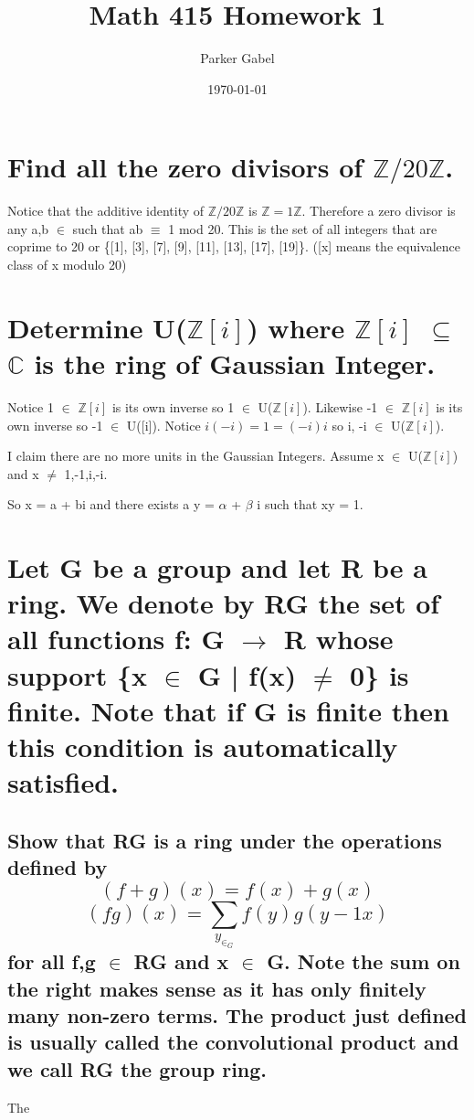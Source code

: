 \documentclass[11pt]{article}
\author{Parker Gabel}
\date{\today}
\title{Math 415 Homework 1}
\begin{document}
\maketitle

\section{Find all the zero divisors of \(\mathbb{Z}/20\mathbb{Z}\).}
\label{sec:orgafd2bb1}
Notice that the additive identity of \(\mathbb{Z}/20\mathbb{Z}\) is \(\mathbb{Z} = 1 \mathbb{Z}\). 
Therefore a zero divisor is any a,b \(\in\)  such that ab \(\equiv\) 1 mod 20. This is the set of all integers that are coprime to 20 or \{[1], [3], [7], [9], [11], [13], [17], [19]\}. ([x] means the equivalence class of x modulo 20)

\section{Determine U(\(\mathbb{Z}[i]\)) where \(\mathbb{Z}[i]\) \(\subseteq\) \(\mathbb{C}\) is the ring of Gaussian Integer.}
\label{sec:org5e4fd1e}
\quad Notice 1 \(\in\) \(\mathbb{Z}[i]\) is its own inverse so 1 \(\in\) U(\(\mathbb{Z}[i]\)). Likewise -1 \(\in\) \(\mathbb{Z}[i]\) is its own inverse so -1 \(\in\) U([i]).
Notice \(i(-i) = 1 = (-i)i\) so i, -i \(\in\) U(\(\mathbb{Z}[i]\)). \par 
I claim there are no more units in the Gaussian Integers.
Assume x \(\in\) U(\(\mathbb{Z}[i]\)) and x \(\ne\) 1,-1,i,-i. \par
So x = a + bi and there exists a y = \(\alpha\) + \(\beta\) i such that xy = 1. \par

\section{Let G be a group and let R be a ring.  We denote by RG the set of all functions f: G \(\to\) R whose support \{x \(\in\) G | f(x) \(\ne\) 0\} is finite.  Note that if G is finite then this condition is automatically satisfied.}
\label{sec:org036eeed}
\subsection{Show that RG is a ring under the operations defined by \[(f+g)(x) =f(x) +g(x)\]    \[(fg)(x) =\sum_y_\in_G f(y)g(y-1x) \]for all f,g \(\in\) RG and x \(\in\) G.  Note the sum on the right makes sense as it has only finitely many non-zero terms. The product just defined is usually called the convolutional product and we call RG the group ring.}
\label{sec:org0ea0a96}
The
\end{document}

